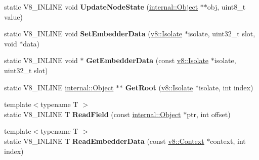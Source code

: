 \begin{DoxyCompactItemize}
\item 
static V8\+\_\+\+I\+N\+L\+I\+NE void {\bfseries Update\+Node\+State} (\hyperlink{classv8_1_1internal_1_1_object}{internal\+::\+Object} $\ast$$\ast$obj, uint8\+\_\+t value)\hypertarget{classv8_1_1internal_1_1_internals_a0f37a58646403a6a39f925006a98a0d0}{}\label{classv8_1_1internal_1_1_internals_a0f37a58646403a6a39f925006a98a0d0}

\item 
static V8\+\_\+\+I\+N\+L\+I\+NE void {\bfseries Set\+Embedder\+Data} (\hyperlink{classv8_1_1_isolate}{v8\+::\+Isolate} $\ast$isolate, uint32\+\_\+t slot, void $\ast$data)\hypertarget{classv8_1_1internal_1_1_internals_abe73d79832edf012f30a94ccc4b293d2}{}\label{classv8_1_1internal_1_1_internals_abe73d79832edf012f30a94ccc4b293d2}

\item 
static V8\+\_\+\+I\+N\+L\+I\+NE void $\ast$ {\bfseries Get\+Embedder\+Data} (const \hyperlink{classv8_1_1_isolate}{v8\+::\+Isolate} $\ast$isolate, uint32\+\_\+t slot)\hypertarget{classv8_1_1internal_1_1_internals_ab53d3d4ef80770cb3e7d10effed86d10}{}\label{classv8_1_1internal_1_1_internals_ab53d3d4ef80770cb3e7d10effed86d10}

\item 
static V8\+\_\+\+I\+N\+L\+I\+NE \hyperlink{classv8_1_1internal_1_1_object}{internal\+::\+Object} $\ast$$\ast$ {\bfseries Get\+Root} (\hyperlink{classv8_1_1_isolate}{v8\+::\+Isolate} $\ast$isolate, int index)\hypertarget{classv8_1_1internal_1_1_internals_aae733fd76f6f692f83a6ded4ac8f1571}{}\label{classv8_1_1internal_1_1_internals_aae733fd76f6f692f83a6ded4ac8f1571}

\item 
{\footnotesize template$<$typename T $>$ }\\static V8\+\_\+\+I\+N\+L\+I\+NE T {\bfseries Read\+Field} (const \hyperlink{classv8_1_1internal_1_1_object}{internal\+::\+Object} $\ast$ptr, int offset)\hypertarget{classv8_1_1internal_1_1_internals_a62d4c79489a23c4e0598e3e2561ffdd8}{}\label{classv8_1_1internal_1_1_internals_a62d4c79489a23c4e0598e3e2561ffdd8}

\item 
{\footnotesize template$<$typename T $>$ }\\static V8\+\_\+\+I\+N\+L\+I\+NE T {\bfseries Read\+Embedder\+Data} (const \hyperlink{classv8_1_1_context}{v8\+::\+Context} $\ast$context, int index)\hypertarget{classv8_1_1internal_1_1_internals_a98cf4d5b60b963cc544cdd3aeda52335}{}\label{classv8_1_1internal_1_1_internals_a98cf4d5b60b963cc544cdd3aeda52335}

\end{DoxyCompactItemize}
